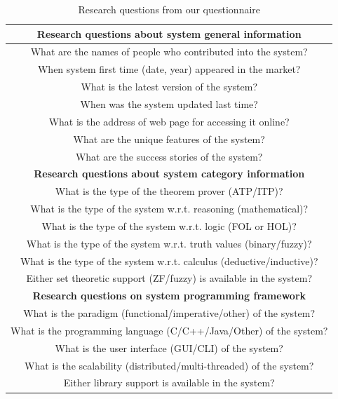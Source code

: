 \begin{table}[!ht]
 \caption{Research questions from our questionnaire}\vspace{-2mm} 
 \centering 
\begin{tabular}{|c|}
      \hline
{\bf Research questions about system general information}\\\hline
  What are the names of people who contributed into the system? \\ 
  When system first time (date, year) appeared in the market? \\ 
  What is the latest version of the system? \\ 
  When was the system updated last time? \\ 
  What is the address of web page for accessing it online? \\ 
  What are the unique features of the system? \\ 
  What are the success stories of the system?\\ 
      \hline
{\bf Research questions about system category information}\\\hline
  What is the type of the theorem prover (ATP/ITP)? \\ 
  What is the type of the system w.r.t. reasoning (mathematical)? \\ 
  What is the type of the system w.r.t. logic (FOL or HOL)? \\ 
  What is the type of the system w.r.t. truth values (binary/fuzzy)? \\%
  What is the type of the system w.r.t. calculus (deductive/inductive)? \\%
  Either set theoretic support (ZF/fuzzy) is available in the system? \\
  \hline
{\bf Research questions on system programming framework}\\\hline
  What is the paradigm (functional/imperative/other) of the system? \\ 
  What is the programming language (C/C++/Java/Other) of the system? \\ 
  What is the user interface (GUI/CLI) of the system? \\ 
  What is the scalability (distributed/multi-threaded) of the system? \\ 
  Either library support is available in the system? \\ \hline
\end{tabular}
\label{modeltools3}
\end{table}

